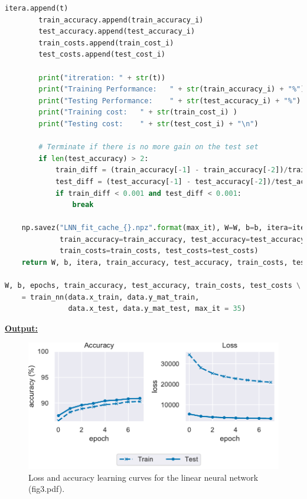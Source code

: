 \documentclass{article}
\begin{document}
\begin{biomathy}
\begin{lstlisting}[language=python]
        itera.append(t)
        train_accuracy.append(train_accuracy_i)
        test_accuracy.append(test_accuracy_i)
        train_costs.append(train_cost_i)
        test_costs.append(test_cost_i)

        print("itreration: " + str(t))
        print("Training Performance:   " + str(train_accuracy_i) + "%")
        print("Testing Performance:    " + str(test_accuracy_i) + "%")
        print("Training cost:   " + str(train_cost_i) )
        print("Testing cost:    " + str(test_cost_i) + "\n")

        # Terminate if there is no more gain on the test set
        if len(test_accuracy) > 2:
            train_diff = (train_accuracy[-1] - train_accuracy[-2])/train_accuracy[-1]
            test_diff = (test_accuracy[-1] - test_accuracy[-2])/test_accuracy[-1]
            if train_diff < 0.001 and test_diff < 0.001:
                break

    np.savez("LNN_fit_cache_{}.npz".format(max_it), W=W, b=b, itera=itera,
             train_accuracy=train_accuracy, test_accuracy=test_accuracy,
             train_costs=train_costs, test_costs=test_costs)
    return W, b, itera, train_accuracy, test_accuracy, train_costs, test_costs

W, b, epochs, train_accuracy, test_accuracy, train_costs, test_costs \
    = train_nn(data.x_train, data.y_mat_train,
               data.x_test, data.y_mat_test, max_it = 35)
\end{lstlisting}
\end{biomathy}



\noindent \underline{\textbf{Output:}} \\


\begin{figure}[H]
        \centering
        \includegraphics{fig3.pdf}
        \caption{Loss and accuracy learning curves for the linear neural
        network (fig3.pdf).}
        \label{fig3}
\end{figure}
\end{document}
